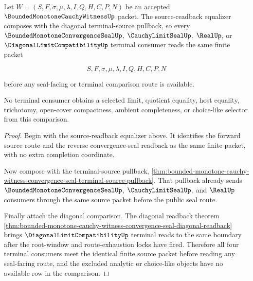 \begin{theorem}
\label{thm:bounded-monotone-cauchy-witness-terminal-source-equalizer}
Let $W=(S,F,\sigma,\mu,\lambda,I,Q,H,C,P,N)$ be an accepted $\BoundedMonotoneCauchyWitnessUp$ packet. The source-readback equalizer composes with the diagonal terminal-source pullback, so every $\BoundedMonotoneConvergenceSealUp$, $\CauchyLimitSealUp$, $\RealUp$, or $\DiagonalLimitCompatibilityUp$ terminal consumer reads the same finite packet

$$
S,F,\sigma,\mu,\lambda,I,Q,H,C,P,N
$$

before any seal-facing or terminal comparison route is available.

No terminal consumer obtains a selected limit, quotient equality, host equality, trichotomy, open-cover compactness, ambient completeness, or choice-like selector from this comparison.
\end{theorem}
\begin{proof}
Begin with the source-readback equalizer above. It identifies the forward source route and the reverse convergence-seal readback as the same finite packet, with no extra completion coordinate.

Now compose with the terminal-source pullback, \autoref{thm:bounded-monotone-cauchy-witness-convergence-seal-terminal-source-pullback}. That pullback already sends $\BoundedMonotoneConvergenceSealUp$, $\CauchyLimitSealUp$, and $\RealUp$ consumers through the same source packet before the public seal route.

Finally attach the diagonal comparison. The diagonal readback theorem \autoref{thm:bounded-monotone-cauchy-witness-convergence-seal-diagonal-readback} brings $\DiagonalLimitCompatibilityUp$ terminal reads to the same boundary after the root-window and route-exhaustion locks have fired. Therefore all four terminal consumers meet the identical finite source packet before reading any seal-facing route, and the excluded analytic or choice-like objects have no available row in the comparison.
\end{proof}

